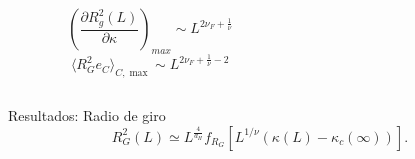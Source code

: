 \documentclass[xcolor=dvipsnames]{beamer}
\begin{document}
\begin{frame}
\begin{columns}[T]
  \begin{column}{5.8cm}
    \begin{figure}[h]
      \centering
      \resizebox{\columnwidth}{!}{}
    \end{figure}
    \begin{equation*}
      \left(\frac{\partial R_g^2(L)}{\partial \kappa}\right)_{max}\sim
      L^{2\nu_F+\frac{1}{\nu}}
    \end{equation*}
    \begin{equation*}
      \langle R_G^2 e_C\rangle_{C,\max}\sim  L^{2\nu_F+\frac{1}{\nu}-2}
    \end{equation*}
  \end{column}
  \begin{column}{5.8cm}
    \begin{figure}[h]
      \centering
     \resizebox{\columnwidth}{!}{ }
    \end{figure}
  \end{column}
\end{columns} 
\end{frame}

\begin{frame}{Resultados: Radio de giro}
\begin{equation*}
    R^2_G(L)\simeq L^{\frac{4}{d_H}}f_{R_G}\left[L^{1/\nu}(\kappa(L)-\kappa_c(\infty))\right].
\end{equation*} 
\begin{figure}[h]
      \centering
     \resizebox{0.9\columnwidth}{!}{ }
    \end{figure}
\end{frame}
\end{document}
